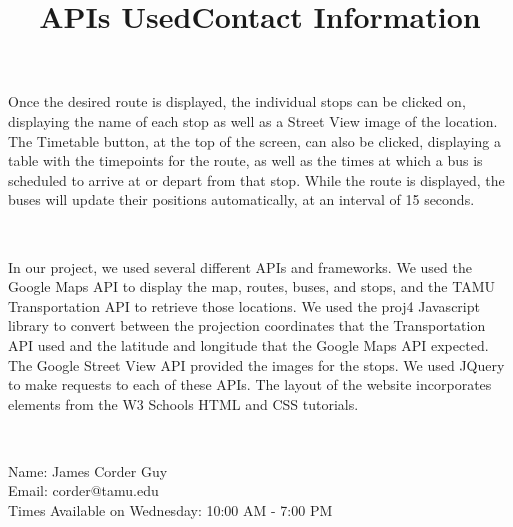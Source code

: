 \documentclass[12pt]{report}
\begin{document}
    Once the desired route is displayed, the individual stops can be clicked on, displaying the name of each stop as well as a Street View image of the location. The Timetable button, at the top of the screen, can also be clicked, displaying a table with the timepoints for the route, as well as the times at which a bus is scheduled to arrive at or depart from that stop. While the route is displayed, the buses will update their positions automatically, at an interval of 15 seconds. \\
	

    \begin{center}
		\title{\textbf{APIs Used}} \\
	\end{center}

    In our project, we used several different APIs and frameworks. We used the Google Maps API to display the map, routes, buses, and stops, and the TAMU Transportation API to retrieve those locations. We used the proj4 Javascript library to convert between the projection coordinates that the Transportation API used and the latitude and longitude that the Google Maps API expected. The Google Street View API provided the images for the stops. We used JQuery to make requests to each of these APIs. The layout of the website incorporates elements from the W3 Schools HTML and CSS tutorials. \\

	\begin{center}
		\title{\textbf{Contact Information}} \\
	\end{center}

	\noindent
	Name: James Corder Guy\\
	Email: corder@tamu.edu\\
	Times Available on Wednesday: 10:00 AM - 7:00 PM\\
	\newpage
	
	
	
	
\end{document}
